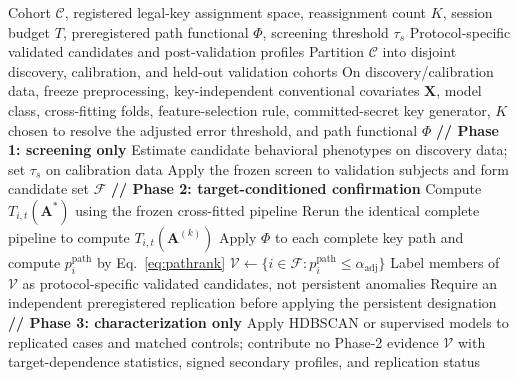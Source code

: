 \documentclass[11pt,letterpaper]{article}
\begin{document}
\begin{algorithm}[t]
\caption{Persistent Target-Dependence Identification Protocol}
\label{alg:protocol}
\begin{algorithmic}[1]
\REQUIRE Cohort $\mathcal{C}$, registered legal-key assignment space, reassignment count $K$, session budget $T$, preregistered path functional $\Phi$, screening threshold $\tau_s$
\ENSURE Protocol-specific validated candidates and post-validation profiles
\STATE Partition $\mathcal{C}$ into disjoint discovery, calibration, and held-out validation cohorts
\STATE On discovery/calibration data, freeze preprocessing, key-independent conventional covariates $\mathbf{X}$, model class, cross-fitting folds, feature-selection rule, committed-secret key generator, $K$ chosen to resolve the adjusted error threshold, and path functional $\Phi$
\STATE \textbf{// Phase 1: screening only}
\STATE Estimate candidate behavioral phenotypes on discovery data; set $\tau_s$ on calibration data
\STATE Apply the frozen screen to validation subjects and form candidate set $\mathcal{F}$
\STATE \textbf{// Phase 2: target-conditioned confirmation}
    \STATE Compute $T_{i,t}(\mathbf{A}^{*})$ using the frozen cross-fitted pipeline
        \STATE Rerun the identical complete pipeline to compute $T_{i,t}(\mathbf{A}^{(k)})$
    \ENDFOR
\ENDFOR
\STATE Apply $\Phi$ to each complete key path and compute $p_i^{\mathrm{path}}$ by Eq.~\ref{eq:pathrank}
\STATE $\mathcal{V}\leftarrow\{i\in\mathcal{F}: p_i^{\mathrm{path}}\leq\alpha_{\mathrm{adj}}\}$
\STATE Label members of $\mathcal{V}$ as protocol-specific validated candidates, not persistent anomalies
\STATE Require an independent preregistered replication before applying the persistent designation
\STATE \textbf{// Phase 3: characterization only}
\STATE Apply HDBSCAN or supervised models to replicated cases and matched controls; contribute no Phase-2 evidence
\RETURN $\mathcal{V}$ with target-dependence statistics, signed secondary profiles, and replication status
\end{algorithmic}
\end{algorithm}
\end{document}
